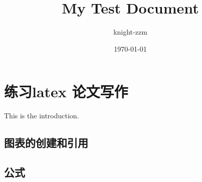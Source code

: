 \documentclass[a4paper,12pt]{article}
\begin{document}
\title{My Test Document}
\author{knight-zzm}
\date{\today}
\maketitle
\newpage
\section{练习latex 论文写作}
This is the introduction.

\subsection{图表的创建和引用}
\subsection{公式}
\end{document}
